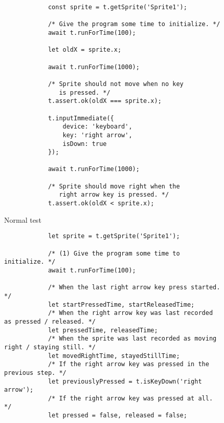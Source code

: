 \begin{listing}[htpb]
    \centering
    \begin{subfigure}[b]{.35\textwidth}
        \centering
        \begin{verbatim}
            const sprite = t.getSprite('Sprite1');

            /* Give the program some time to initialize. */
            await t.runForTime(100);

            let oldX = sprite.x;

            await t.runForTime(1000);

            /* Sprite should not move when no key
               is pressed. */
            t.assert.ok(oldX === sprite.x);

            t.inputImmediate({
                device: 'keyboard',
                key: 'right arrow',
                isDown: true
            });

            await t.runForTime(1000);

            /* Sprite should move right when the
               right arrow key is pressed. */
            t.assert.ok(oldX < sprite.x);
        \end{verbatim}
        \caption{Normal test}
    \end{subfigure}
    \hspace{.08\textwidth}
    \begin{subfigure}[b]{.55\textwidth}
        \centering
        \begin{verbatim}
            let sprite = t.getSprite('Sprite1');

            /* (1) Give the program some time to initialize. */
            await t.runForTime(100);

            /* When the last right arrow key press started. */
            let startPressedTime, startReleasedTime;
            /* When the right arrow key was last recorded as pressed / released. */
            let pressedTime, releasedTime;
            /* When the sprite was last recorded as moving right / staying still. */
            let movedRightTime, stayedStillTime;
            /* If the right arrow key was pressed in the previous step. */
            let previouslyPressed = t.isKeyDown('right arrow');
            /* If the right arrow key was pressed at all. */
            let pressed = false, released = false;


\end{verbatim}
\end{subfigure}
\end{listing}
